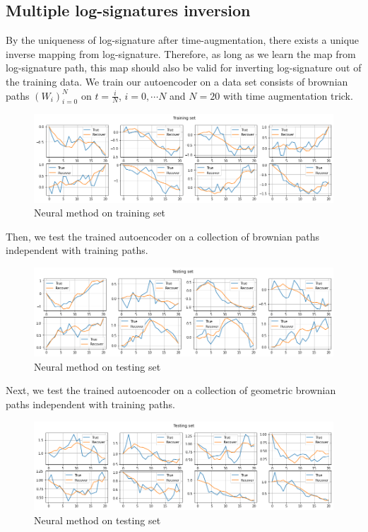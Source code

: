 \documentclass[12pt]{report}
\theoremstyle{definition}
\theoremstyle{remark}
\begin{document}
\subsection{Multiple log-signatures inversion}
By the uniqueness of log-signature after time-augmentation, there exists a unique inverse mapping from log-signature. Therefore, as long as we learn the map from log-signature path, this map should also be valid for inverting log-signature out of the training data. We train our autoencoder on a data set consists of brownian paths $(W_{i})_{i=0}^{N}$ on $t = \frac{i}{N}$, $i = 0,\cdots N$ and $N = 20$ with time augmentation trick. 
 \begin{figure}[H]
  \centering
  \includegraphics[width=\textwidth]{figs/inverse10.png}
  \caption{Neural method on training set }
\end{figure}
Then, we test the trained autoencoder on a collection of brownian paths independent with training paths.
 \begin{figure}[H]
  \centering
  \includegraphics[width=\textwidth]{figs/inverse11.png}
  \caption{Neural method on testing set }
\end{figure}
Next, we test the trained autoencoder on a collection of geometric brownian paths independent with training paths.
 \begin{figure}[H]
  \centering
  \includegraphics[width=\textwidth]{figs/inverse12.png}
  \caption{Neural method on testing set }
\end{figure}
\end{document}
